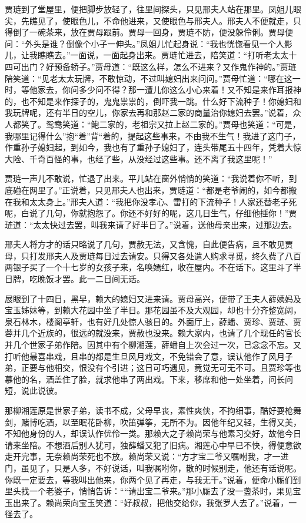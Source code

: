 \documentclass[12pt,oneside]{book}
\begin{document}
贾琏到了堂屋里，便把脚步放轻了，往里间探头，只见邢夫人站在那里。凤姐儿眼尖，先瞧见了，使眼色儿，不命他进来，又使眼色与邢夫人。邢夫人不便就走，只得倒了一碗茶来，放在贾母跟前。贾母一回身，贾琏不防，便没躲伶俐。贾母便问：“外头是谁？倒像个小子一伸头。”凤姐儿忙起身说：“我也恍惚看见一个人影儿，让我瞧瞧去。”一面说，一面起身出来。贾琏忙进去，陪笑道：“打听老太太十四可出门？好预备轿子。”贾母道：“既这么样，怎么不进来？又作鬼作神的。”贾琏陪笑道：“见老太太玩牌，不敢惊动，不过叫媳妇出来问问。”贾母忙道：“哪在这一时，等他家去，你问多少问不得？那一遭儿你这么小心来着！又不知是来作耳报神的，也不知是来作探子的，鬼鬼祟祟的，倒吓我一跳。什么好下流种子！你媳妇和我玩牌呢，还有半日的空儿，你家去再和那赵二家的商量治你媳妇去罢。”说着，众人都笑了。鸳鸯笑道：“鲍二家的，老祖宗又拉上赵二家的。”贾母也笑道：“可是，我哪里记得什么”抱“着”背“着的，提起这些事来，不由我不生气！我进了这门子，作重孙子媳妇起，到如今，我也有了重孙子媳妇了，连头带尾五十四年，凭着大惊大险、千奇百怪的事，也经了些，从没经过这些事。还不离了我这里呢！”

贾琏一声儿不敢说，忙退了出来。平儿站在窗外悄悄的笑道：“我说着你不听，到底碰在网里了。”正说着，只见邢夫人也出来，贾琏道：“都是老爷闹的，如今都搬在我和太太身上。”邢夫人道：“我把你没孝心、雷打的下流种子！人家还替老子死呢，白说了几句，你就抱怨了。你还不好好的呢，这几日生气，仔细他捶你！”贾琏道：“太太快过去罢，叫我来请了好半日了。”说着，送他母亲出来，过那边去。

邢夫人将方才的话只略说了几句，贾赦无法，又含愧，自此便告病，且不敢见贾母，只打发邢夫人及贾琏每日过去请安。只得又各处遣人购求寻觅，终久费了八百两银子买了一个十七岁的女孩子来，名唤嫣红，收在屋内。不在话下。这里斗了半日牌，吃晚饭才罢。此一二日间无话。

展眼到了十四日，黑早，赖大的媳妇又进来请。贾母高兴，便带了王夫人薛姨妈及宝玉姊妹等，到赖大花园中坐了半日。那花园虽不及大观园，却也十分齐整宽阔，泉石林木，楼阁亭轩，也有好几处惊人骇目的。外面厅上，薛蟠、贾珍、贾琏、贾蓉并几个近族的，很远的就没来，贾赦也没来。赖大家内，也请了几个现任的官长并几个世家子弟作陪。因其中有个柳湘莲，薛蟠自上次会过一次，已念念不忘。又打听他最喜串戏，且串的都是生旦风月戏文，不免错会了意，误认他作了风月子弟，正要与他相交，恨没有个引进；这日可巧遇见，竟觉无可无不可。且贾珍等也慕他的名，酒盖住了脸，就求他串了两出戏。下来，移席和他一处坐着，问长问短，说此说彼。

那柳湘莲原是世家子弟，读书不成，父母早丧，素性爽侠，不拘细事，酷好耍枪舞剑，赌博吃酒，以至眠花卧柳，吹笛弹筝，无所不为。因他年纪又轻，生得又美，不知他身份的人，却误认作优伶一类。那赖大之子赖尚荣与他素习交好，故他今日请来坐陪。不想酒后别人犹可，独薛蟠又犯了旧病。湘莲心中早已不快，得便意欲走开完事，无奈赖尚荣死也不放。赖尚荣又说：“方才宝二爷又嘱咐我，才一进门，虽见了，只是人多，不好说话，叫我嘱咐你，散的时候别走，他还有话说呢。你既一定要去，等我叫出他来，你两个见了再走，与我无干。”说着，便命小厮们到里头找一个老婆子，悄悄告诉：““请出宝二爷来。”那小厮去了没一盏茶时，果见宝玉出来了。赖尚荣向宝玉笑道：“好叔叔，把他交给你，我张罗人去了。”说着，一径去了。
\end{document}
